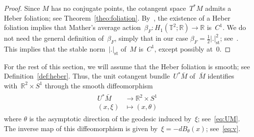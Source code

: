 \documentclass[AHL,Unicode,longabstracts,published]{cedram}
\newcommand{\R}{\mathbb{R}}
\newcommand{\T}{\mathbb{T}}
\newcommand{\rst}{\mathrm{st}}
\begin{document}
\begin{proof}
Since $M$ has no conjugate points, the cotangent space~$T^*M$ admits a Heber foliation; see Theorem~\ref{theo:foliation}. By~\cite[Lemma~5]{MS11}, the existence of a Heber foliation implies that Mather's average action~$\beta_F:H_1(\T^2;\R) \to \R$ is~$C^1$. We do not need the general definition of~$\beta_F$, simply that in our case $\beta_F = \frac{1}{2} |. |_{\rst}^2$; see~\cite[Proposition~3.3]{BM08}. This implies that the stable norm~$|.|_{\rst}$ of~$M$ is~$C^1$, except possibly at~$0$.
\end{proof}

For the rest of this section, we will assume that the Heber foliation is smooth; see Definition~\ref{def:heber}. Thus, the unit cotangent bundle~$U^*\bar{M}$ of~$\bar{M}$ identifies with~$\R^2 \times S^1$ through the smooth diffeomorphism
\begin{align}\label{eq:identification1}
\begin{split}
U^*\bar{M} & \rightarrow \R^2 \times S^1 \\
(x,\xi) & \mapsto (x,\theta)
\end{split}
\end{align}
where $\theta$ is the asymptotic direction of the geodesic induced by~$\xi$; see~\eqref{eq:UM}. The inverse map of this diffeomorphism is given by~$\xi=-dB_\theta(x)$; see~\eqref{eq:v}.

\end{document}
